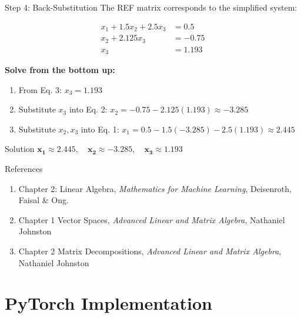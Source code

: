 \documentclass[aspectratio=169,xcolor=dvipsnames,svgnames,x11names,fleqn]{beamer}
\begin{document}
\begin{frame}{Step 4: Back-Substitution}
\centering
The REF matrix corresponds to the simplified system:

\vspace{3mm}
\begin{align*}
x_1 + 1.5x_2 + 2.5x_3 &= 0.5 \\
x_2 + 2.125x_3 &= -0.75 \\
x_3 &= 1.193
\end{align*}

\vspace{5mm}
\textbf{Solve from the bottom up:}
\begin{enumerate}
    \item From Eq. 3: \alert{$x_3 = 1.193$}
    \item Substitute $x_3$ into Eq. 2: $x_2 = -0.75 - 2.125(1.193) \approx -3.285$
    \item Substitute $x_2, x_3$ into Eq. 1: $x_1 = 0.5 - 1.5(-3.285) - 2.5(1.193) \approx 2.445$
\end{enumerate}

\vspace{3mm}
\begin{block}{Solution}
$\mathbf{x_1 \approx 2.445, \quad x_2 \approx -3.285, \quad x_3 \approx 1.193}$
\end{block}
\end{frame}

\begin{frame}{References}

    \begin{enumerate}
        \item Chapter 2: Linear Algebra, \textit{Mathematics for Machine Learning}, Deisenroth, Faisal \& Ong.
        \item Chapter 1 Vector Spaces, \textit{Advanced Linear and Matrix Algebra}, Nathaniel Johnston
        \item Chapter 2 Matrix Decompositions, \textit{Advanced Linear and Matrix Algebra}, Nathaniel Johnston
    \end{enumerate}
    
\end{frame}


\section{PyTorch Implementation}

\begin{frame}
    \sectionpage
\end{frame}
\end{document}
